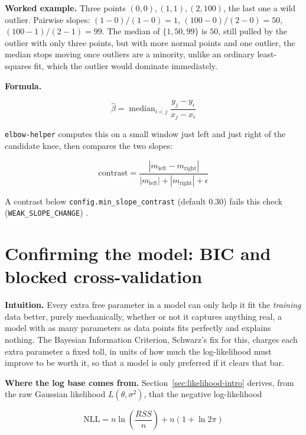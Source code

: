 \documentclass[11pt]{article}
\newcommand{\code}[1]{\texttt{#1}}
\begin{document}
\textbf{Worked example.} Three points $(0,0), (1,1), (2,100)$, the last one
a wild outlier. Pairwise slopes: $(1-0)/(1-0)=1$, $(100-0)/(2-0)=50$,
$(100-1)/(2-1)=99$. The median of $\{1, 50, 99\}$ is $50$, still pulled by
the outlier with only three points, but with more normal points and one
outlier, the median stops moving once outliers are a minority, unlike an
ordinary least-squares fit, which the outlier would dominate immediately.

\textbf{Formula.}

\begin{equation}
\hat\beta = \operatorname{median}_{i < j} \frac{y_j - y_i}{x_j - x_i}
\end{equation}

\code{elbow-helper} computes this on a small window just left and just
right of the candidate knee, then compares the two slopes:

\begin{equation}
\text{contrast} = \frac{|m_{\text{left}} - m_{\text{right}}|}{|m_{\text{left}}| + |m_{\text{right}}| + \epsilon}
\end{equation}

A contrast below \code{config.\allowbreak min\_slope\_contrast} (default $0.30$) fails
this check (\code{WEAK\_SLOPE\_CHANGE}) \citep{theil1950} \citep{sen1968}.

\section{Confirming the model: BIC and blocked cross-validation}
\label{sec:bic-cv}

\textbf{Intuition.} Every extra free parameter in a model can only help it
fit the \emph{training} data better, purely mechanically, whether or not it
captures anything real, a model with as many parameters as data points fits
perfectly and explains nothing. The Bayesian Information Criterion,
Schwarz's fix for this, charges each extra parameter a fixed toll, in units
of how much the log-likelihood must improve to be worth it, so that a model
is only preferred if it clears that bar.

\textbf{Where the log base comes from.} Section~\ref{sec:likelihood-intro}
derives, from the raw Gaussian likelihood $L(\theta,\sigma^2)$, that the
negative log-likelihood

\begin{equation}
\mathrm{NLL} = n \ln\!\left(\frac{RSS}{n}\right) + n(1 + \ln 2\pi)
\end{equation}
\end{document}
